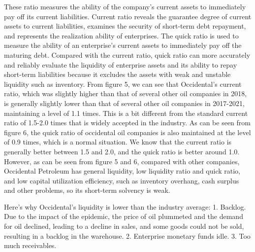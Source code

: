 \documentclass[
	a4paper, %
	12pt,%
]{CSSullivanBusinessReport}
\begin{document}
\begin{fullwidth}
These ratio measures the ability of the company's current assets to immediately pay off its current liabilities. 
Current ratio reveals the guarantee degree of current assets to current liabilities, examines the security of short-term debt repayment, and represents the realization ability of enterprises. The quick ratio is used to measure the ability of an enterprise's current assets to immediately pay off the maturing debt. Compared with the current ratio, quick ratio can more accurately and reliably evaluate the liquidity of enterprise assets and its ability to repay short-term liabilities because it excludes the assets with weak and unstable liquidity such as inventory.  From figure 5, we can see that Occidental's current ratio, which was slightly higher than that of several other oil companies in 2018, is generally slightly lower than that of several other oil companies in 2017-2021, maintaining a level of 1.1 times. This is a bit different from the standard current ratio of 1.5-2.0 times that is widely accepted in the industry.  As can be seen from figure 6, the quick ratio of occidental oil companies is also maintained at the level of 0.9 times, which is a normal situation. We know that the current ratio is generally better between 1.5 and 2.0, and the quick ratio is better around 1.0. However, as can be seen from figure 5 and 6, compared with other companies, Occidental Petroleum has general liquidity, low liquidity ratio and quick ratio, and low capital utilization efficiency, such as inventory overhang, cash surplus and other problems, so its short-term solvency is weak. 
\par
Here's why Occidental's liquidity is lower than the industry average: 1. Backlog. Due to the impact of the epidemic, the price of oil plummeted and the demand for oil declined, leading to a decline in sales, and some goods could not be sold, resulting in a backlog in the warehouse. 2. Enterprise monetary funds idle. 3. Too much receivables.


\end{fullwidth}
\end{document}
